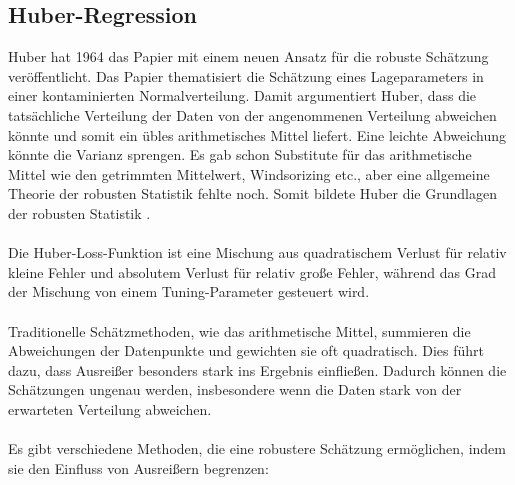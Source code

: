 \subsection{Huber-Regression}
\label{huberregression}
Huber hat 1964 das Papier  mit einem neuen Ansatz für die robuste Schätzung veröffentlicht. Das Papier thematisiert die Schätzung eines Lageparameters in einer kontaminierten Normalverteilung. Damit argumentiert Huber, dass die tatsächliche Verteilung der Daten von der angenommenen Verteilung abweichen könnte und somit ein übles arithmetisches Mittel liefert. Eine leichte Abweichung könnte die Varianz sprengen. Es gab schon Substitute für das arithmetische Mittel wie den getrimmten Mittelwert, Windsorizing etc., aber eine allgemeine Theorie der robusten Statistik fehlte noch. Somit bildete Huber die Grundlagen der robusten Statistik \cite{huberpapier}. \\\\
Die Huber-Loss-Funktion ist eine Mischung aus quadratischem Verlust für relativ kleine Fehler und absolutem Verlust für relativ große Fehler, während das Grad der Mischung von einem Tuning-Parameter gesteuert wird\cite{indirekthuber}. 
\\\\
Traditionelle Schätzmethoden, wie das arithmetische Mittel, summieren die Abweichungen der Datenpunkte und gewichten sie oft quadratisch. Dies führt dazu, dass Ausreißer besonders stark ins Ergebnis einfließen. Dadurch können die Schätzungen ungenau werden, insbesondere wenn die Daten stark von der erwarteten Verteilung abweichen.
\\\\
Es gibt verschiedene Methoden, die eine robustere Schätzung ermöglichen, indem sie den Einfluss von Ausreißern begrenzen:

